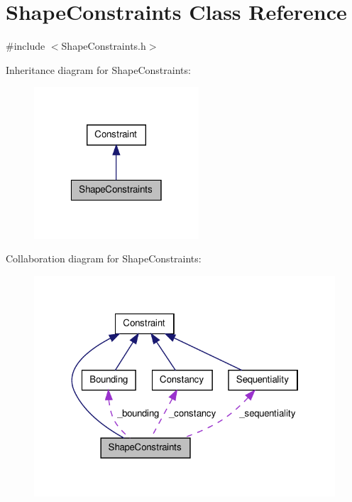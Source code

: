 \hypertarget{classShapeConstraints}{\section{\-Shape\-Constraints \-Class \-Reference}
\label{classShapeConstraints}
}


{\ttfamily \#include $<$\-Shape\-Constraints.\-h$>$}



\-Inheritance diagram for \-Shape\-Constraints\-:
\nopagebreak
\begin{figure}[H]
\begin{center}
\leavevmode
\includegraphics[width=174pt]{classShapeConstraints__inherit__graph}
\end{center}
\end{figure}


\-Collaboration diagram for \-Shape\-Constraints\-:
\nopagebreak
\begin{figure}[H]
\begin{center}
\leavevmode
\includegraphics[width=320pt]{classShapeConstraints__coll__graph}
\end{center}
\end{figure}
